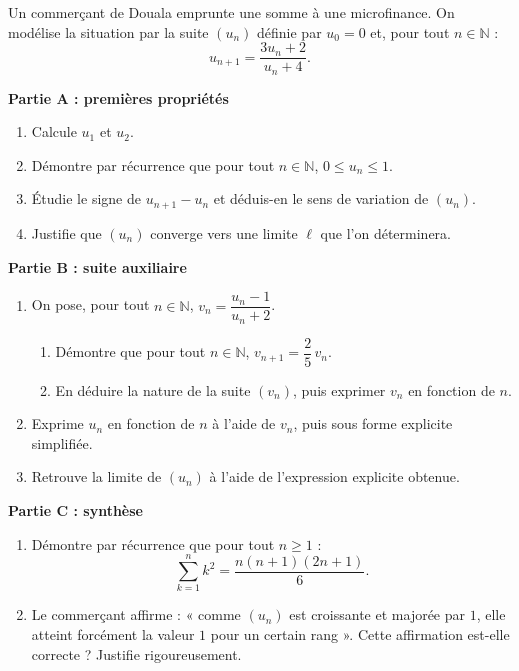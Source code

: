 \documentclass[11pt]{article}
\begin{document}
\begin{exercice}
Un commerçant de Douala emprunte une somme à une microfinance. On modélise la situation par la suite $(u_n)$ définie par $u_0 = 0$ et, pour tout $n \in \mathbb{N}$ :
\[ u_{n+1} = \frac{3u_n + 2}{u_n + 4}. \]

\textbf{Partie A : premières propriétés}
\begin{enumerate}
\item Calcule $u_1$ et $u_2$.
\item Démontre par récurrence que pour tout $n \in \mathbb{N}$, $0 \leq u_n \leq 1$.
\item Étudie le signe de $u_{n+1} - u_n$ et déduis-en le sens de variation de $(u_n)$.
\item Justifie que $(u_n)$ converge vers une limite $\ell$ que l'on déterminera.
\end{enumerate}

\textbf{Partie B : suite auxiliaire}
\begin{enumerate}
\item On pose, pour tout $n \in \mathbb{N}$, $v_n = \dfrac{u_n - 1}{u_n + 2}$.
\begin{enumerate}
\item Démontre que pour tout $n \in \mathbb{N}$, $v_{n+1} = \dfrac{2}{5}\, v_n$.
\item En déduire la nature de la suite $(v_n)$, puis exprimer $v_n$ en fonction de $n$.
\end{enumerate}
\item Exprime $u_n$ en fonction de $n$ à l'aide de $v_n$, puis sous forme explicite simplifiée.
\item Retrouve la limite de $(u_n)$ à l'aide de l'expression explicite obtenue.
\end{enumerate}

\textbf{Partie C : synthèse}
\begin{enumerate}
\item Démontre par récurrence que pour tout $n \geq 1$ :
\[ \sum_{k=1}^{n} k^2 = \frac{n(n+1)(2n+1)}{6}. \]
\item Le commerçant affirme : « comme $(u_n)$ est croissante et majorée par $1$, elle atteint forcément la valeur $1$ pour un certain rang ». Cette affirmation est-elle correcte ? Justifie rigoureusement.
\end{enumerate}
\end{exercice}

\newpage
\end{document}
